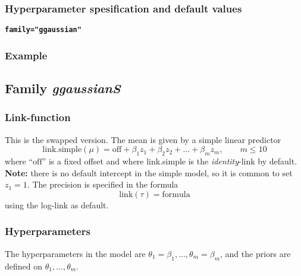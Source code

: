 \documentclass[a4paper,11pt]{article}
\begin{document}
\subsubsection*{Hyperparameter spesification and default values}
\textbf{\texttt{family="ggaussian"}}


\subsubsection*{Example}


\clearpage

\subsection*{Family \emph{ggaussianS}}
\subsubsection*{Link-function}

This is the swapped version. The mean is given by a simple linear
predictor
\begin{displaymath}
    \text{link.simple}(\mu) = \text{off} + \beta_1 z_1 + \beta_2 z_2 + \ldots + \beta_{m} z_{m}, \qquad m \leq 10
\end{displaymath}
where ``$\text{off}$'' is a fixed offset and where link.simple is the
\emph{identity}-link by default. \textbf{Note:} there is no default
intercept in the simple model, so it is common to set $z_1=1$. The
precision is specified in the formula
\begin{displaymath}
    \text{link}(\tau) = \text{formula}
\end{displaymath}
using the log-link as default.

\subsubsection*{Hyperparameters}
The hyperparameters in the model are
$\theta_1=\beta_1, \ldots, \theta_m=\beta_m$, and the priors are
defined on $\theta_1, \ldots, \theta_m$.
\end{document}
